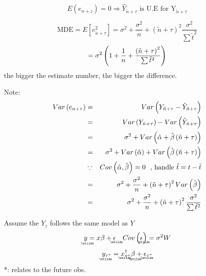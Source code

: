 \documentclass{article}
\begin{document}
\begin{equation*}
E\left( e_{n+z}\right) =0\Rightarrow \hat{Y}_{\tilde{n}+\tau }\text{ is U.E
for Y}_{\tilde{n}+\tau }
\end{equation*}

\begin{equation*}
\text{MDE}=E\left[ e_{\tilde{n}+\tau }^{2}\right] =\sigma ^{2}+\frac{\sigma
^{2}}{n}+\left( \tilde{n}+\tau \right) ^{2}\frac{\sigma ^{2}}{\sum \tilde{t}%
^{2}}
\end{equation*}%
\begin{equation*}
=\sigma ^{2}\left( 1+\frac{1}{n}+\frac{\left( \tilde{n}+\tau \right) ^{2}}{%
\sum \tilde{t}^{2}}\right)
\end{equation*}%
the bigger the estimate number, the bigger the difference.

Note:%
\begin{eqnarray*}
Var\left( e_{n+\tau }\right) &=&Var\left( Y_{\tilde{n}+\tau }-\hat{Y}_{%
\tilde{n}+\tau }\right) \\
&=&Var\left( Y_{\tilde{n}+\tau }\right) -Var\left( \hat{Y}_{\tilde{n}+\tau
}\right) \\
&=&\sigma ^{2}+Var\left( \hat{\alpha}+\hat{\beta}\left( \tilde{n}+\tau
\right) \right) \\
&=&\sigma ^{2}+Var\left( \hat{\alpha}\right) +Var\left( \hat{\beta}\left( 
\tilde{n}+\tau \right) \right) \\
&\because &Cov\left( \hat{\alpha},\hat{\beta}\right) =0\text{, handle }%
\tilde{t}=t-\bar{t} \\
&=&\sigma ^{2}+\frac{\sigma ^{2}}{n}+\left( \tilde{n}+\tau \right)
^{2}Var\left( \hat{\beta}\right) \\
&=&\sigma ^{2}+\frac{\sigma ^{2}}{n}+\left( \tilde{n}+\tau \right) ^{2}\frac{%
\sigma ^{2}}{\sum \tilde{t}^{2}}
\end{eqnarray*}

\bigskip

Assume the $Y_{z}$ follows the same model as $Y$%
\begin{equation*}
\underaccent{\wtilde}{y}%
=x\beta +%
\underaccent{\wtilde}{\epsilon}%
\quad Cov\left( 
\underaccent{\wtilde}{\epsilon}%
\right) =\sigma ^{2}W
\end{equation*}%
\begin{equation*}
\underaccent{\wtilde}{y}%
_{\tau ^{\ast }}=%
\underaccent{\wtilde}{x}%
_{\tau ^{\ast }}^{\dagger }%
\underaccent{\wtilde}{\beta}%
+%
\underaccent{\wtilde}{\epsilon}%
_{\tau ^{\ast }}
\end{equation*}%
*: relates to the future obs.
\end{document}

